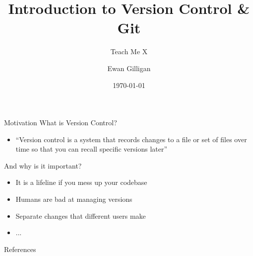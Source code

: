 \documentclass{beamer}
\title{Introduction to Version Control \& Git}
\subtitle{Teach Me X}
\author{Ewan Gilligan}
\date{\today}
\begin{document}

\begin{frame}
	\maketitle %
\end{frame}

\begin{frame}{Motivation}
What is Version Control?
    \begin{itemize}
        \item ``Version control is a system that records changes to a file or set of files over time so that you can recall specific versions later'' \cite{10.5555/2695634}
    \end{itemize}
And why is it important?
    \begin{itemize}
        \item It is a lifeline if you mess up your codebase
        \item Humans are bad at managing versions
        \item Separate changes that different users make
        \item ...
    \end{itemize}
\end{frame}

\begin{frame}{References}
    \printbibliography[heading=none]
\end{frame}
\end{document}
